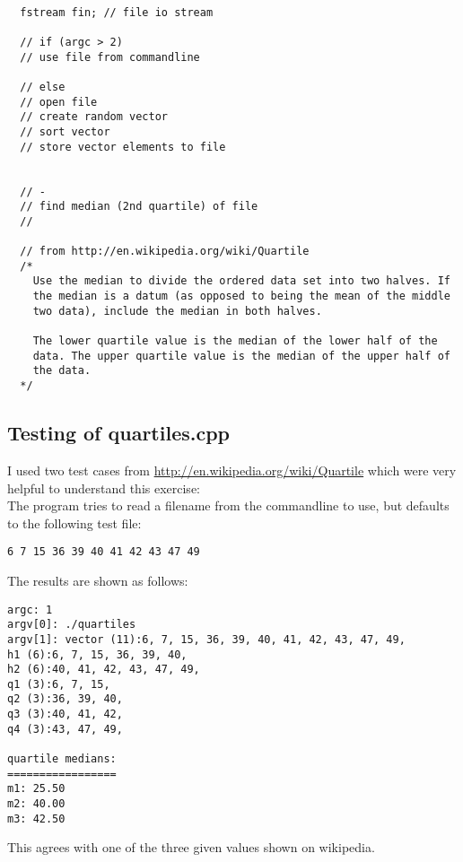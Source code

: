 \documentclass[11pt, oneside]{memoir}
\begin{document}
\begin{lstlisting}

  fstream fin; // file io stream

  // if (argc > 2)
  // use file from commandline

  // else
  // open file
  // create random vector
  // sort vector
  // store vector elements to file


  // -
  // find median (2nd quartile) of file
  //
  
  // from http://en.wikipedia.org/wiki/Quartile
  /*
    Use the median to divide the ordered data set into two halves. If
    the median is a datum (as opposed to being the mean of the middle
    two data), include the median in both halves. 
    
    The lower quartile value is the median of the lower half of the 
    data. The upper quartile value is the median of the upper half of
    the data. 
  */

\end{lstlisting}





\subsection{Testing of quartiles.cpp}

I used two test cases from \url{http://en.wikipedia.org/wiki/Quartile}
which were very helpful to understand this exercise: \\

The program tries to read a filename from the commandline to use, but
defaults to the following test file:

\begin{verbatim}
6 7 15 36 39 40 41 42 43 47 49
\end{verbatim}

The results are shown as follows:

\begin{verbatim}
argc: 1
argv[0]: ./quartiles
argv[1]: vector (11):6, 7, 15, 36, 39, 40, 41, 42, 43, 47, 49, 
h1 (6):6, 7, 15, 36, 39, 40, 
h2 (6):40, 41, 42, 43, 47, 49, 
q1 (3):6, 7, 15, 
q2 (3):36, 39, 40, 
q3 (3):40, 41, 42, 
q4 (3):43, 47, 49, 

quartile medians:
=================
m1: 25.50
m2: 40.00
m3: 42.50
\end{verbatim}

This agrees with one of the three given values shown on wikipedia.
\end{document}
